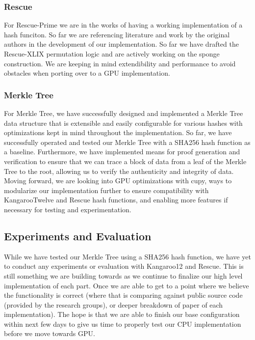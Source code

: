 \documentclass[conference]{IEEEtran}
\begin{document}
\subsubsection{Rescue}

For Rescue-Prime we are in the works of having a working implementation of a hash funciton. So far we are referencing literature and work by the original authors in the development of our implementation. So far we have drafted the Rescue-XLIX permutation logic and are actively working on the sponge construction. We are keeping in mind extendibility and performance to avoid obstacles when porting over to a GPU implementation.

\subsubsection{Merkle Tree}

For Merkle Tree, we have successfully designed and implemented a Merkle Tree data structure that is extensible and easily configurable for various hashes with optimizations kept in mind throughout the implementation. So far, we have successfully operated and tested our Merkle Tree with a SHA256 hash function as a baseline. Furthermore, we have implemented means for proof generation and verification to ensure that we can trace a block of data from a leaf of the Merkle Tree to the root, allowing us to verify the authenticity and integrity of data. Moving forward, we are looking into GPU optimizations with cupy, ways to modularize our implementation further to ensure compatibility with KangarooTwelve and Rescue hash functions, and enabling more features if necessary for testing and experimentation.

\subsection{Experiments and Evaluation}

While we have tested our Merkle Tree using a SHA256 hash function, we have yet to conduct any experiments or evaluation with Kangaroo12 and Rescue. This is still something we are building towards as we continue to finalize our high level implementation of each part. Once we are able to get to a point where we believe the functionality is correct (where that is comparing against public source code (provided by the research groups), or deeper breakdown of paper of each implementation). The hope is that we are able to finish our base configuration within next few days to give us time to properly test our CPU implementation before we move towards GPU.
\end{document}
